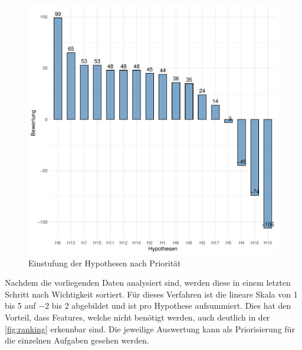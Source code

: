 \begin{figure}[H]
\centering
\includegraphics[width=0.8\columnwidth]{figures/plots/ranking.pdf}
\caption{\label{fig:ranking} Einstufung der Hypothesen nach Priorität}
\end{figure}

Nachdem die vorliegenden Daten analysiert sind, werden diese in einem letzten Schritt nach Wichtigkeit sortiert. Für dieses Verfahren ist die lineare Skala von 1 bis 5 auf $-2$ bis 2 abgebildet und ist pro Hypothese aufsummiert. Dies hat den Vorteil, dass Features, welche nicht benötigt werden, auch deutlich in der \autoref{fig:ranking} erkennbar sind. Die jeweilige Auswertung kann als Priorisierung für die einzelnen Aufgaben gesehen werden.

